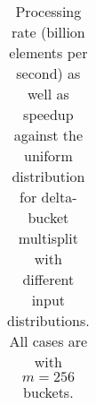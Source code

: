 \begin{table}
\begin{tabular}{lll cc | cc | cc}
\bottomrule
\end{tabular}
\caption{Processing rate (billion elements per second) as well as speedup against the uniform distribution for delta-bucket multisplit with different input distributions. All cases are with $m=256$ buckets.}\label{table:distribution}
\end{table}
